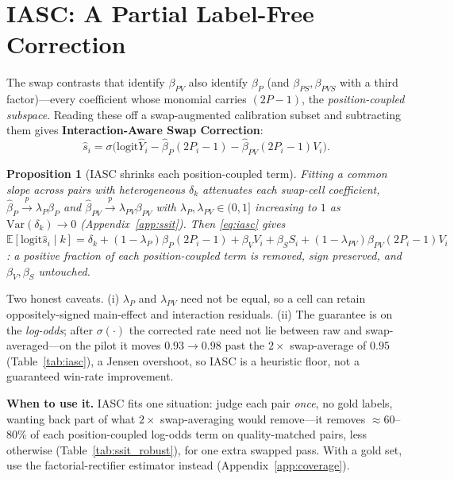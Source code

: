 \documentclass{article}
\newtheorem{proposition}{Proposition}
\newcommand{\logit}{\mathrm{logit}}
\newcommand{\E}{\mathbb{E}}
\begin{document}
\section{IASC: A Partial Label-Free Correction}
\label{sec:iasc}

The swap contrasts that identify $\beta_{PV}$ also identify
$\beta_P$ (and $\beta_{PS},\beta_{PVS}$ with a third factor)---every
coefficient whose monomial carries $(2P{-}1)$, the
\emph{position-coupled subspace}. Reading these off a
swap-augmented calibration subset and subtracting them gives
\textbf{Interaction-Aware Swap Correction}:
\begin{equation}
  \hat s_i = \sigma\!\bigl(\logit\hat Y_i
    - \hat\beta_P(2P_i{-}1) - \hat\beta_{PV}(2P_i{-}1)V_i\bigr).
  \label{eq:iasc}
\end{equation}

\begin{proposition}[IASC shrinks each position-coupled term]
\label{prop:iasc}
Fitting a common slope across pairs with heterogeneous $\delta_k$
attenuates each swap-cell coefficient,
$\hat\beta_P\xrightarrow{p}\lambda_P\beta_P$ and
$\hat\beta_{PV}\xrightarrow{p}\lambda_{PV}\beta_{PV}$ with
$\lambda_P,\lambda_{PV}\in(0,1]$ increasing to $1$ as
$\mathrm{Var}(\delta_k)\to0$ (Appendix~\ref{app:ssit}). Then
\eqref{eq:iasc} gives $\E[\logit\hat s_i\mid k]=\delta_k
+(1{-}\lambda_P)\beta_P(2P_i{-}1)+\beta_V V_i+\beta_S S_i
+(1{-}\lambda_{PV})\beta_{PV}(2P_i{-}1)V_i$: a positive fraction of
each position-coupled term is removed, sign preserved, and
$\beta_V,\beta_S$ untouched.
\end{proposition}

\noindent Two honest caveats. (i) $\lambda_P$ and $\lambda_{PV}$
need not be equal, so a cell can retain oppositely-signed
main-effect and interaction residuals. (ii) The guarantee is on the
\emph{log-odds}; after $\sigma(\cdot)$ the corrected rate need not
lie between raw and swap-averaged---on the pilot it moves
$0.93\to0.98$ past the $2\times$ swap-average of $0.95$
(Table~\ref{tab:iasc}), a Jensen overshoot, so IASC is a heuristic
floor, not a guaranteed win-rate improvement.

\noindent\textbf{When to use it.} IASC fits one situation: judge
each pair \emph{once}, no gold labels, wanting back part of what
$2\times$ swap-averaging would remove---it removes $\approx60$--$80\%$
of each position-coupled log-odds term on quality-matched pairs,
less otherwise (Table~\ref{tab:ssit_robust}), for one extra swapped
pass. With a gold set, use the factorial-rectifier estimator instead
(Appendix~\ref{app:coverage}).
\end{document}
